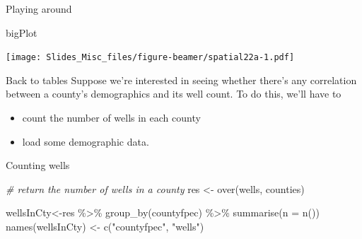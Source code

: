 \documentclass[
  ignorenonframetext,
]{beamer}
\newenvironment{Shaded}{\begin{snugshade}}{\end{snugshade}}
\newcommand{\AttributeTok}[1]{\textcolor[rgb]{0.77,0.63,0.00}{#1}}
\newcommand{\CommentTok}[1]{\textcolor[rgb]{0.56,0.35,0.01}{\textit{#1}}}
\newcommand{\FunctionTok}[1]{\textcolor[rgb]{0.00,0.00,0.00}{#1}}
\newcommand{\NormalTok}[1]{#1}
\newcommand{\OtherTok}[1]{\textcolor[rgb]{0.56,0.35,0.01}{#1}}
\newcommand{\SpecialCharTok}[1]{\textcolor[rgb]{0.00,0.00,0.00}{#1}}
\newcommand{\StringTok}[1]{\textcolor[rgb]{0.31,0.60,0.02}{#1}}
\begin{document}
\begin{frame}[fragile]{Playing around}
\protect\hypertarget{playing-around-2}{}
\begin{Shaded}
\begin{Highlighting}[]
\NormalTok{bigPlot}
\end{Highlighting}
\end{Shaded}

\texttt{[image: Slides\_Misc\_files/figure-beamer/spatial22a-1.pdf]}
\end{frame}

\begin{frame}{Back to tables}
\protect\hypertarget{back-to-tables}{}
Suppose we're interested in seeing whether there's any correlation
between a county's demographics and its well count. To do this, we'll
have to

\begin{itemize}
\item
  count the number of wells in each county
\item
  load some demographic data.
\end{itemize}
\end{frame}

\begin{frame}[fragile]{Counting wells}
\protect\hypertarget{counting-wells}{}
\tiny

\begin{Shaded}
\begin{Highlighting}[]
\CommentTok{\# return the number of wells in a county}
\NormalTok{res }\OtherTok{\textless{}{-}} \FunctionTok{over}\NormalTok{(wells, counties)}

\NormalTok{wellsInCty}\OtherTok{\textless{}{-}}\NormalTok{res }\SpecialCharTok{\%\textgreater{}\%} \FunctionTok{group\_by}\NormalTok{(countyfpec) }\SpecialCharTok{\%\textgreater{}\%} \FunctionTok{summarise}\NormalTok{(}\AttributeTok{n =} \FunctionTok{n}\NormalTok{())}
\FunctionTok{names}\NormalTok{(wellsInCty) }\OtherTok{\textless{}{-}} \FunctionTok{c}\NormalTok{(}\StringTok{"countyfpec"}\NormalTok{, }\StringTok{"wells"}\NormalTok{)}
\end{Highlighting}
\end{Shaded}
\end{frame}
\end{document}
